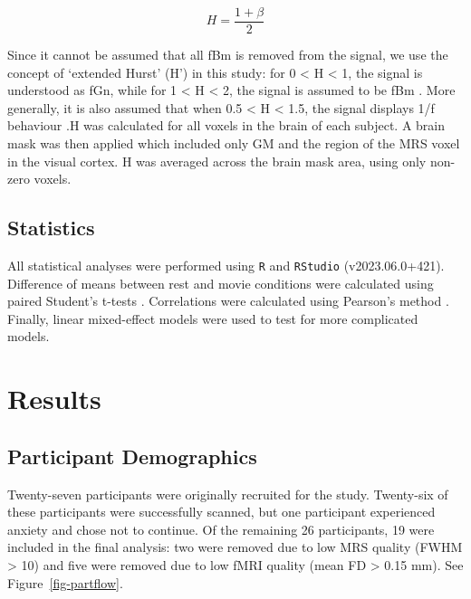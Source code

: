 \documentclass[
true
]{sn-jnl}
\begin{document}
\[
H = \frac{1 + \beta}{2}
\]

Since it cannot be assumed that all fBm is removed from the signal, we
use the concept of `extended Hurst' (H') in this study: for 0
\textless{} H \textless{} 1, the signal is understood as fGn, while for
1 \textless{} H \textless{} 2, the signal is assumed to be fBm
\citep{campbellFractalBasedAnalysisFMRI2022}. More generally, it is also
assumed that when 0.5 \textless{} H \textless{} 1.5, the signal displays
1/f behaviour \citep{zimmernWhyBrainCriticality2020}.H was calculated
for all voxels in the brain of each subject. A brain mask was then
applied which included only GM and the region of the MRS voxel in the
visual cortex. H was averaged across the brain mask area, using only
non-zero voxels.

\subsection{Statistics}\label{statistics}

All statistical analyses were performed using \texttt{R}
\citep{rcoreteamLanguageEnvironmentStatistical2021} and \texttt{RStudio}
(v2023.06.0+421). Difference of means between rest and movie conditions
were calculated using paired Student's t-tests
\citep{studentProbableErrorMean1908}. Correlations were calculated using
Pearson's method \citep{freedmanStatistics2007}. Finally, linear
mixed-effect models were used to test for more complicated models.

\section{Results}\label{results}

\subsection{Participant Demographics}\label{participant-demographics}

Twenty-seven participants were originally recruited for the study.
Twenty-six of these participants were successfully scanned, but one
participant experienced anxiety and chose not to continue. Of the
remaining 26 participants, 19 were included in the final analysis: two
were removed due to low MRS quality (FWHM \textgreater{} 10) and five
were removed due to low fMRI quality (mean FD \textgreater{} 0.15 mm).
See Figure~\ref{fig-partflow}.
\end{document}
